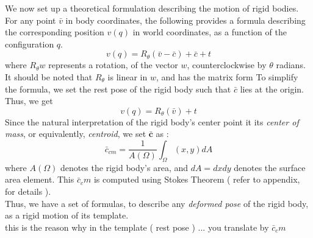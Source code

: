 \documentclass{article}
\begin{document}


\indent We now set up a theoretical formulation describing the motion of rigid bodies. For any point $\bar{v}$ in body coordinates, the following provides a formula describing the corresponding position $v(q)$ in world coordinates, as a function of the configuration $q$. 
\begin{equation}
	v(q) = R_{\theta}(\bar{v} - \bar{c}) + \bar{c} + t
\end{equation}
where $R_{\theta}w$ represents a rotation, of the vector $w$, counterclockwise by $\theta$ radians. It should be noted that $R_{\theta}$ is linear in $w$, and has the matrix form
To simplify the formula, we set the rest pose of the rigid body such that $\bar{c}$ lies at the origin. Thus, we get 
\begin{equation}
	v(q) = R_{\theta}(\bar{v}) + t
\end{equation}  
Since the natural interpretation of the rigid body's center point it its \textit{center of mass}, or equivalently, \textit{centroid}, we set $\mathbf{\bar{c}}$ as : 
\begin{equation}
	\bar{c}_{cm} = \frac{1}{A(\Omega)} \int_{\Omega}(x,y)dA
\end{equation}
where $A(\Omega)$ denotes the rigid body's area, and $dA = dxdy$ denotes the surface area element. This $\bar{c}_cm$ is computed using Stokes Theorem ( refer to appendix, for details ). \\
Thus, we have a set of formulas, to describe any \textit{deformed pose} of the rigid body, as a rigid motion of its template.\\
 this is the reason why in the template ( rest pose ) ... you translate by $\bar{c}_cm$
\end{document}
